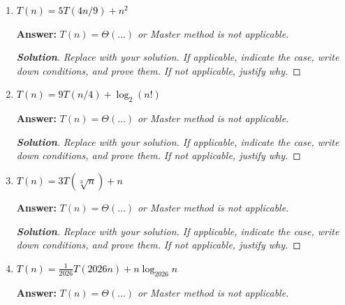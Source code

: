 \documentclass[dvipsnames]{article}
\begin{document}
\begin{problem}
\begin{enumerate}
\begin{mdframed}
    \begin{proof}[\textbf{Solution}]
      \emph{Replace with your solution. If applicable, indicate the case, write down conditions, and prove them.}
      \emph{If not applicable, justify why.}
    \end{proof}
  \end{mdframed}
  
  \item \textcolor{black}{$T(n) = 5 T(4 n / 9) + n^2$}
  \begin{mdframed}
    \color{purple}
    \textbf{Answer:} $T(n) = \Theta(\ldots)$ \emph{or Master method is not applicable.}
    
    \begin{proof}[\textbf{Solution}]
      \emph{Replace with your solution. If applicable, indicate the case, write down conditions, and prove them.}
      \emph{If not applicable, justify why.}
    \end{proof}
  \end{mdframed}
  
  \item \textcolor{black}{$T(n) = 9 T(n / 4) + \log_2 \left(n!\right)$}
  \begin{mdframed}
    \color{purple}
    \textbf{Answer:} $T(n) = \Theta(\ldots)$ \emph{or Master method is not applicable.}
    
    \begin{proof}[\textbf{Solution}]
      \emph{Replace with your solution. If applicable, indicate the case, write down conditions, and prove them.}
      \emph{If not applicable, justify why.}
    \end{proof}
  \end{mdframed}
  
  \item \textcolor{black}{$T(n) = 3 T(\sqrt[3]{n}) + n$}
  \begin{mdframed}
    \color{purple}
    \textbf{Answer:} $T(n) = \Theta(\ldots)$ \emph{or Master method is not applicable.}
    
    \begin{proof}[\textbf{Solution}]
      \emph{Replace with your solution. If applicable, indicate the case, write down conditions, and prove them.}
      \emph{If not applicable, justify why.}
    \end{proof}
  \end{mdframed}
  
  \item \textcolor{black}{$T(n) = \frac{1}{2026} T(2026 n) + n \log_{2026} n$}
  \begin{mdframed}
    \color{purple}
    \textbf{Answer:} $T(n) = \Theta(\ldots)$ \emph{or Master method is not applicable.}
    

\end{mdframed}
\end{enumerate}
\end{problem}
\end{document}
